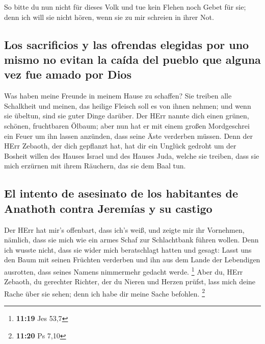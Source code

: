 So bitte du nun nicht für dieses Volk und tue kein
Flehen noch Gebet für sie; denn ich will sie nicht hören, wenn sie zu
mir schreien in ihrer Not.

\hypertarget{los-sacrificios-y-las-ofrendas-elegidas-por-uno-mismo-no-evitan-la-cauxedda-del-pueblo-que-alguna-vez-fue-amado-por-dios}{%
\subsection{Los sacrificios y las ofrendas elegidas por uno mismo no
evitan la caída del pueblo que alguna vez fue amado por
Dios}\label{los-sacrificios-y-las-ofrendas-elegidas-por-uno-mismo-no-evitan-la-cauxedda-del-pueblo-que-alguna-vez-fue-amado-por-dios}}

 Was haben meine Freunde in meinem Hause zu schaffen? Sie
treiben alle Schalkheit und meinen, das heilige Fleisch soll es von
ihnen nehmen; und wenn sie übeltun, sind sie guter Dinge darüber.
 Der HErr nannte dich einen grünen, schönen, fruchtbaren
Ölbaum; aber nun hat er mit einem großen Mordgeschrei ein Feuer um ihn
lassen anzünden, dass seine Äste verderben müssen.  Denn
der HErr Zebaoth, der dich gepflanzt hat, hat dir ein Unglück gedroht um
der Bosheit willen des Hauses Israel und des Hauses Juda, welche sie
treiben, dass sie mich erzürnen mit ihrem Räuchern, das sie dem Baal
tun.

\hypertarget{el-intento-de-asesinato-de-los-habitantes-de-anathoth-contra-jeremuxedas-y-su-castigo}{%
\subsection{El intento de asesinato de los habitantes de Anathoth contra
Jeremías y su
castigo}\label{el-intento-de-asesinato-de-los-habitantes-de-anathoth-contra-jeremuxedas-y-su-castigo}}

 Der HErr hat mir's offenbart, dass ich's weiß, und
zeigte mir ihr Vornehmen,  nämlich, dass sie mich wie ein
armes Schaf zur Schlachtbank führen wollen. Denn ich wusste nicht, dass
sie wider mich beratschlagt hatten und gesagt: Lasst uns den Baum mit
seinen Früchten verderben und ihn aus dem Lande der Lebendigen
ausrotten, dass seines Namens nimmermehr gedacht werde. \footnote{\textbf{11:19}
  Jes 53,7}  Aber du, HErr Zebaoth, du gerechter Richter,
der du Nieren und Herzen prüfst, lass mich deine Rache über sie sehen;
denn ich habe dir meine Sache befohlen. \footnote{\textbf{11:20} Ps 7,10}

